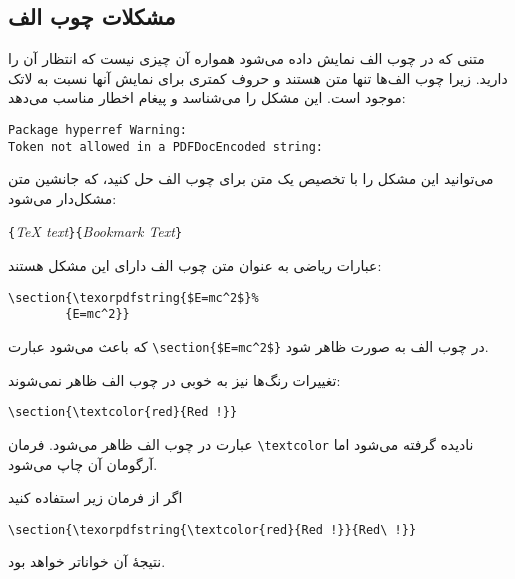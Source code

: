 \subsection{مشکلات چوب الف}
متنی که در چوب الف نمایش داده می‌شود همواره آن چیزی نیست که انتظار آن را دارید. زیرا چوب الف‌ها تنها متن هستند و حروف کمتری برای نمایش آنها نسبت به لاتک موجود است.  این مشکل را می‌شناسد و پیغام اخطار مناسب می‌دهد:
\begin{code}
\setLR
\begin{verbatim}
Package hyperref Warning: 
Token not allowed in a PDFDocEncoded string:
\end{verbatim}
\setRL
\end{code}
می‌توانید این مشکل را با تخصیص یک متن برای چوب الف حل کنید، که جانشین متن مشکل‌دار می‌شود:

\begin{lscommand}
\verb|{|\emph{\TeX{} text}\verb|}{|\emph{Bookmark Text}\verb|}|
\end{lscommand}

عبارات ریاضی به عنوان متن چوب الف دارای این مشکل هستند:
\begin{code}
\begin{verbatim}
\section{\texorpdfstring{$E=mc^2$}%
        {E=mc^2}}
\end{verbatim}
\end{code}
که باعث می‌شود عبارت \verb+\section{$E=mc^2$}+ در چوب الف به صورت  ظاهر شود.

تغییرات رنگ‌ها نیز به خوبی در چوب الف ظاهر نمی‌شوند:
\begin{code}
\verb+\section{\textcolor{red}{Red !}}+
\end{code}
عبارت  در چوب الف ظاهر می‌شود. فرمان  \verb+\textcolor+ نادیده گرفته می‌شود اما آرگومان آن  چاپ می‌شود. 

اگر از فرمان زیر استفاده کنید
\begin{code}
\verb+\section{\texorpdfstring{\textcolor{red}{Red !}}{Red\ !}}+
\end{code}
نتیجهٔ آن خواناتر خواهد بود.

